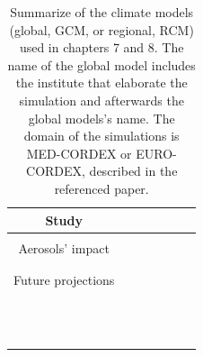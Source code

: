 \begin{table}[h!]
  \begin{tabular}{c|>{\raggedrigth}m{1cm}>{\raggedright}m{2cm}>{\raggedright}m{2cm}>{\raggedright}m{2cm}>{\raggedright}m{1.5cm}>{\raggedright}m{3cm}}
    \toprule 
    Study & \centering{Climate Model}  & &  \tabularnewline
    \midrule                                                         
    & \centering{GCM} & \centering{RCM} & \centering{Domain} & \centering{Resolution RCM} &\centering{Simulation} \tabularnewline                                            
    \midrule
     Aerosols' impact & \centering{CNRM-CM5} & \centering{CNRM-ALADIN53} & \centering{MED-CORDEX} & \centering{0.44º} & \centering{AER}\midrule\\
    \centering{NO-AER}\midrule\\
    \centering{TREND}
    \tabularnewline
   \midrule
    Future projections & \centering{CNRM-CM5} & \centering{ALADIN53}\midrule\\
    \centering{RCA4}\midrule\\
    \centering{CCLM4}\midrule & \centering{EURO-CORDEX} & \centering{0.11º} & \centering{HIST/RCP85}\\
    \centering{HIST/RCP85}\\
    \centering{HIST/RCP85}
    \tabularnewline
          & \centering{ICHEC-EC-EARTH} & \centering{RACMO}\midrule\\
    \centering{RCA4}\midrule\\
    \centering{CCLM4}\midrule & \centering{EURO-CORDEX} & \centering{0.11º} & \centering{HIST/RCP85}\\
    \centering{HIST/RCP85}\\
    \centering{HIST/RCP85}
    \tabularnewline
          & \centering{CNRM-CM5} & \centering{ALADIN-RCSM4}\midrule\\
    \centering{RCA4}\midrule & \centering{MED-CORDEX} & \centering{0.44º} & \centering{HIST/RCP45}\\
    \centering{HIST/RCP85}
    \tabularnewline
 \bottomrule
  \end{tabular}
  \caption{Summarize of the climate models (global, GCM, or regional, RCM) used in chapters 7 and 8. The name of the global model includes the institute that elaborate the simulation and afterwards the global models's name. The domain of the simulations is MED-CORDEX or EURO-CORDEX, described in the referenced paper.}
  \label{climatemodels}
\end{table}
 

